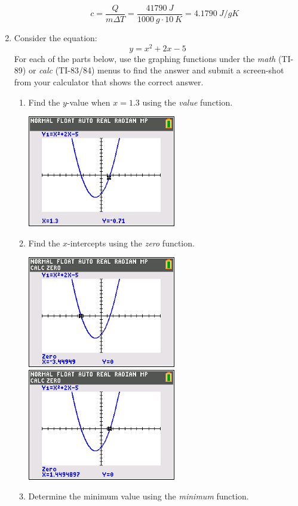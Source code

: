 \documentclass[letterpaper,12pt,fleqn]{article}
\newcommand{\D}{\Delta}
\begin{document}
\begin{enumerate}
\begin{enumerate}
\[c=\frac{Q}{m\D T}=\frac{\SI{41790}{J}}{\SI{1000}{g}\cdot\SI{10}{K}}=
\SI{4.1790}{J/gK}\]
\end{enumerate}

\newpage

\item Consider the equation:
\[y=x^2+2x-5\]
For each of the parts below, use the graphing functions under the \emph{math}
(TI-89) or \emph{calc} (TI-83/84) menus to find the answer and submit a
screen-shot from your calculator that shows the correct answer.
\begin{enumerate}
\item Find the $y$-value when $x=1.3$ using the \emph{value} function.

  \includegraphics[scale=0.75]{hw6-5a.png}
  
\item Find the $x$-intercepts using the \emph{zero} function.

  \includegraphics[scale=0.75]{hw6-5b1.png}
  \includegraphics[scale=0.75]{hw6-5b2.png}

\item Determine the minimum value using the \emph{minimum} function.


\end{enumerate}
\end{enumerate}
\end{document}
